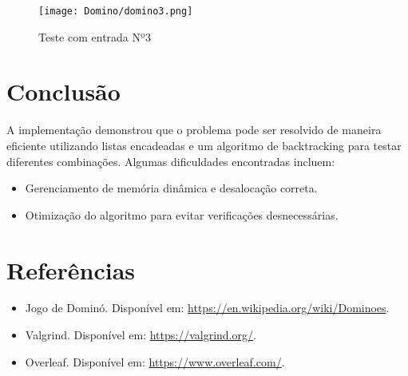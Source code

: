 \documentclass[a4paper,12pt]{article}
\begin{document}
\begin{figure}[H]
    \centering
    \texttt{[image: Domino/domino3.png]}
    \caption{Teste com entrada Nº3}
\end{figure}



\section{Conclus\~ao}
A implementa\c{c}\~ao demonstrou que o problema pode ser resolvido de maneira eficiente utilizando listas encadeadas e um algoritmo de backtracking para testar diferentes combina\c{c}\~oes. Algumas dificuldades encontradas incluem:
\begin{itemize}
    \item Gerenciamento de mem\'oria din\^amica e desaloca\c{c}\~ao correta.
    \item Otimiza\c{c}\~ao do algoritmo para evitar verificações desnecess\'arias.
\end{itemize}

\section{Refer\^encias}
\begin{itemize}
    \item Jogo de Domin\'o. Dispon\'ivel em: \url{https://en.wikipedia.org/wiki/Dominoes}.
    \item Valgrind. Dispon\'ivel em: \url{https://valgrind.org/}.
    \item Overleaf. Dispon\'ivel em: \url{https://www.overleaf.com/}.
\end{itemize}
\end{document}
